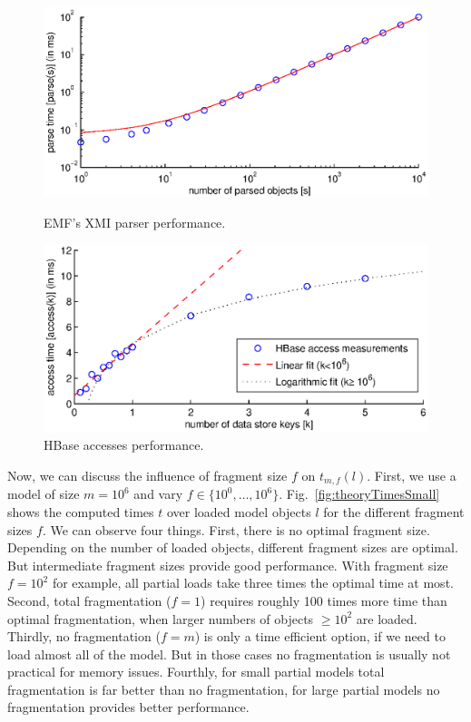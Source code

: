 \begin{figure}[t]
\begin{minipage}[b]{0.48\linewidth}
\centering
\includegraphics[width=\linewidth]{figures/emfParsePerf}
\caption{EMF's XMI parser performance.}
\label{fig:emfParsePerf}
\end{minipage}
\hspace{0.02\linewidth}
\begin{minipage}[b]{0.48\linewidth}
\centering
\includegraphics[width=\linewidth]{figures/hbaseAccessPerf}
\caption{HBase accesses performance.}
\label{fig:hbaseAccessPerf}
\end{minipage}
\end{figure}

 
Now, we can discuss the influence of fragment size $f$ on $t_{m,f}(l)$. First, we use a model of size $m=10^6$ and vary $f\in\{10^0,\dots,10^6\}$. Fig.~\ref{fig:theoryTimesSmall} shows the computed times $t$ over loaded model objects $l$ for the different fragment sizes $f$. We can observe four things. First, there is no optimal fragment size. Depending on the number of loaded objects, different fragment sizes are optimal. But intermediate fragment sizes provide good performance. With fragment size $f=10^2$ for example, all partial loads take three times the optimal time at most. Second, total fragmentation ($f=1$) requires roughly 100 times more time than optimal fragmentation, when larger numbers of objects $\ge 10^2$ are loaded. Thirdly, no fragmentation ($f=m$) is only a time efficient option, if we need to load almost all of the model. But in those cases no fragmentation is usually not practical for memory issues. Fourthly, for small partial models total fragmentation is far better than no fragmentation, for large partial models no fragmentation provides better performance.

